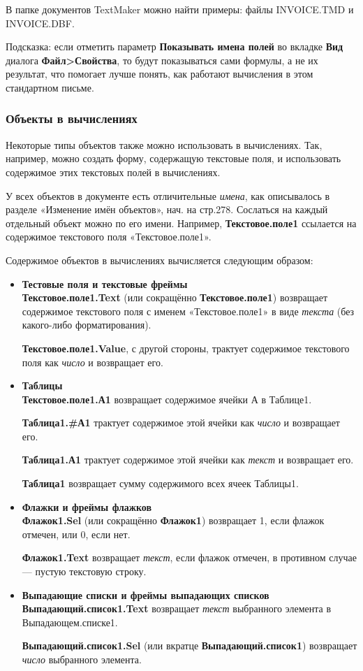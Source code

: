 ﻿\documentclass[a4paper,10pt]{article}
\begin{document}
В папке документов TextMaker можно найти примеры: файлы INVOICE.TMD и INVOICE.DBF.

Подсказка: если отметить параметр \textbf{Показывать имена полей} во вкладке \textbf{Вид} диалога \textbf{Файл>Свойства}, то будут показываться сами формулы, а не их результат, что помогает лучше понять, как работают вычисления в этом стандартном письме.

\subsubsection{Объекты в вычислениях}
Некоторые типы объектов также можно использовать в вычислениях. Так, например, можно создать форму, содержащую текстовые поля, и использовать содержимое этих текстовых полей в вычислениях.

У всех объектов в документе есть отличительные \textit{имена}, как описывалось в разделе «Изменение имён объектов», нач. на стр.278. Сослаться на каждый отдельный объект можно по его имени. Например, \textbf{Текстовое.поле1} ссылается на содержимое текстового поля «Текстовое.поле1».

Содержимое объектов в вычислениях вычисляется следующим образом:

\begin{itemize}
 \item \textbf{Тестовые поля и текстовые фреймы}\\
 \textbf{Текстовое.поле1.Text} (или сокращённо \textbf{Текстовое.поле1}) возвращает содержимое текстового поля с именем «Текстовое.поле1» в виде \textit{текста} (без какого-либо форматирования).
 
 \textbf{Текстовое.поле1.Value}, с другой стороны, трактует содержимое текстового поля как \textit{число} и возвращает его.
 \item \textbf{Таблицы}\\
 \textbf{Текстовое.поле1.А1} возвращает содержимое ячейки А в Таблице1.
 
 \textbf{Таблица1.\#А1} трактует содержимое этой ячейки как \textit{число} и возвращает его.
 
 \textbf{Таблица1.\textdollar А1} трактует содержимое этой ячейки как \textit{текст} и возвращает его.
 
 \textbf{Таблица1} возвращает сумму содержимого всех ячеек Таблицы1.
 \item \textbf{Флажки и фреймы флажков}\\
 \textbf{Флажок1.Sel} (или сокращённо \textbf{Флажок1}) возвращает 1, если флажок отмечен, или 0, если нет.
 
 \textbf{Флажок1.Text} возвращает \textit{текст}, если флажок отмечен, в противном случае — пустую текстовую строку.
 \item \textbf{Выпадающие списки и фреймы выпадающих списков}\\
 \textbf{Выпадающий.список1.Text} возвращает \textit{текст} выбранного элемента в Выпадающем.списке1.
 
 \textbf{Выпадающий.список1.Sel} (или вкратце \textbf{Выпадающий.список1}) возвращает \textit{число} выбранного элемента.
 \end{itemize}
 
\end{document}
